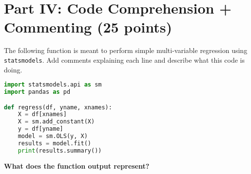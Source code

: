 \documentclass[12pt]{article}
\begin{document}
\newpage
\section*{Part IV: Code Comprehension + Commenting (25 points)}

The following function is meant to perform simple multi-variable regression using \texttt{statsmodels}. Add comments explaining each line and describe what this code is doing.

\begin{lstlisting}[language=Python]
import statsmodels.api as sm
import pandas as pd

def regress(df, yname, xnames):
    X = df[xnames]
    X = sm.add_constant(X)
    y = df[yname]
    model = sm.OLS(y, X)
    results = model.fit()
    print(results.summary())
\end{lstlisting}

\vspace{3.5in}

\textbf{What does the function output represent?}

\vspace{1.5in}
\end{document}
